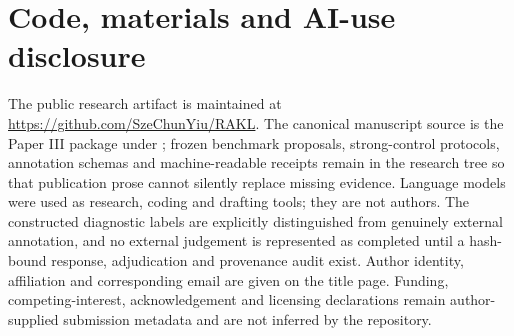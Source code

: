 \documentclass[11pt]{article}
\begin{document}











\section*{Code, materials and AI-use disclosure}
The public research artifact is maintained at \url{https://github.com/SzeChunYiu/RAKL}. The canonical manuscript source is the Paper III package under ; frozen benchmark proposals, strong-control protocols, annotation schemas and machine-readable receipts remain in the research tree so that publication prose cannot silently replace missing evidence. Language models were used as research, coding and drafting tools; they are not authors. The constructed diagnostic labels are explicitly distinguished from genuinely external annotation, and no external judgement is represented as completed until a hash-bound response, adjudication and provenance audit exist. Author identity, affiliation and corresponding email are given on the title page. Funding, competing-interest, acknowledgement and licensing declarations remain author-supplied submission metadata and are not inferred by the repository.


\end{document}
